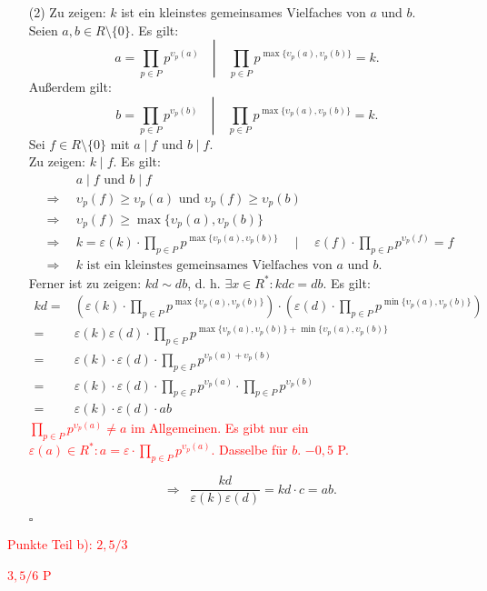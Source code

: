 \documentclass[12pt]{article}
\newcommand{\corr}[1]{\textcolor{red}{#1}}
\newcommand{\QED}{\begin{flushright} $\square$ \end{flushright}}
\newcommand{\df}{\enspace\Longrightarrow\enspace}
\begin{document}
\begin{enumerate}
\begin{enumerate}
		\item[(2)] Zu zeigen: $k$ ist ein kleinstes gemeinsames Vielfaches von $a$ und $b$. \\
		Seien $a,b\in R\setminus\{0\}$. Es gilt:
		$$a=\left.\prod_{p\in P}p^{\upsilon_p(a)} \quad\right\vert\quad \prod_{p\in P}p^{\max\{\upsilon_p(a),\upsilon_p(b)\}} = k.$$
		Außerdem gilt:
		$$b=\left.\prod_{p\in P}p^{\upsilon_p(b)} \quad\right\vert\quad \prod_{p\in P}p^{\max\{\upsilon_p(a),\upsilon_p(b)\}} = k.$$
		Sei $f\in R\setminus\{0\}$ mit $a\mid f$ und $b\mid f$. \\
		Zu zeigen: $k\mid f$. Es gilt: 
		\begin{align*}
			&a\mid f\text{ und }b\mid f \\
			\df &\upsilon_p(f)\geq\upsilon_p(a)\text{ und }\upsilon_p(f)\geq\upsilon_p(b) \\
			\df &\upsilon_p(f)\geq\max\{\upsilon_p(a),\upsilon_p(b)\} \\
			\df &k=\varepsilon(k)\cdot\prod_{p\in P}p^{\max\{\upsilon_p(a),\upsilon_p(b)\}} \quad\mid\quad \varepsilon(f)\cdot\prod_{p\in P}p^{\upsilon_p(f)}=f \\
			\df &k\text{ ist ein kleinstes gemeinsames Vielfaches von $a$ und $b$}.
		\end{align*}
		Ferner ist zu zeigen: $kd\sim db$, d. h. $\exists x\in R^*:kdc=db$. Es gilt:
		\begin{align*}
			kd =& \left(\varepsilon(k)\cdot\prod_{p\in P}p^{\max\{\upsilon_p(a),\upsilon_p(b)\}}\right)\cdot\left(\varepsilon(d)\cdot\prod_{p\in P}p^{\min\{\upsilon_p(a),\upsilon_p(b)\}}\right) \\
			=& \varepsilon(k)\varepsilon(d)\cdot\prod_{p\in P}p^{\max\{\upsilon_p(a),\upsilon_p(b)\}+\min\{\upsilon_p(a),\upsilon_p(b)\}} \\
			=& \varepsilon(k)\cdot\varepsilon(d)\cdot\prod_{p\in P}p^{\upsilon_p(a)+\upsilon_p(b)} \\
			=& \varepsilon(k)\cdot\varepsilon(d)\cdot\prod_{p\in P}p^{\upsilon_p(a)}\cdot\prod_{p\in P}p^{\upsilon_p(b)} \\
			=& \varepsilon(k)\cdot\varepsilon(d)\cdot ab
		\end{align*}
\corr{$\prod_{p\in P}p^{\upsilon_p(a)} \neq a$ im Allgemeinen. Es gibt nur ein $\varepsilon(a)\in R^*: a=\varepsilon \cdot \prod_{p\in P}p^{\upsilon_p(a)}$. Dasselbe für $b$. $-0,5$ P.}


		$$\df \frac{kd}{\varepsilon(k)\varepsilon(d)}=kd\cdot c=ab.$$
		\QED
	\end{enumerate}
\corr{Punkte Teil b): $2,5/3$}
\end{enumerate}
\corr{$3,5/6$ P}
\end{document}

